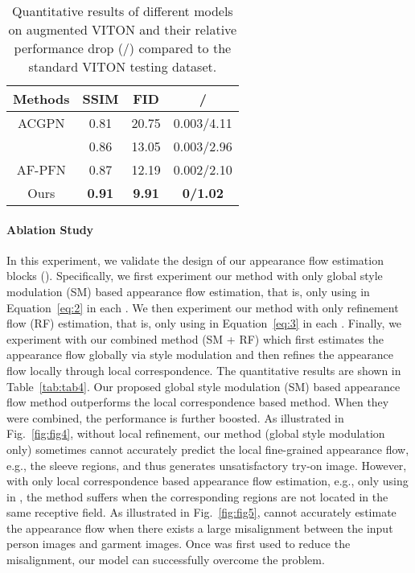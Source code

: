 \documentclass[10pt,twocolumn,letterpaper]{article}
\begin{document}
\begin{table}[t]
    \centering
    \begin{tabular}{c|c|c|c}
    \toprule
         Methods & SSIM & FID&/\\
         \midrule
         
         ACGPN &0.81&20.75&0.003/4.11\\
         \cite{han2019clothflow}&0.86& 13.05&0.003/2.96\\ 
         AF-PFN\cite{ge2021parser} &0.87 &12.19&0.002/2.10\\
         \midrule
         Ours&\textbf{0.91}& \textbf{9.91}&\textbf{0/1.02}\\
         \bottomrule
    \end{tabular}
    \caption{Quantitative results of different models on augmented VITON and their relative performance drop (/) compared to the standard VITON testing dataset.}
    \vspace{-0.4cm}
    \label{tab:tab3}
\end{table}

\paragraph{Ablation Study} In this experiment, we validate the design of our appearance flow estimation blocks (). Specifically, we first experiment our method with only global style modulation (SM) based appearance flow estimation, that is, only using  in Equation~\ref{eq:2} in each . We then experiment our method with only refinement flow (RF) estimation, that is, only using  in Equation~\ref{eq:3} in each . Finally, we experiment with our combined method (SM + RF) which first estimates the appearance flow globally via style modulation and then refines the appearance flow locally through local correspondence. The quantitative results are shown in Table~\ref{tab:tab4}. Our proposed global style modulation (SM) based appearance flow method outperforms the local correspondence based method. When they were combined, the performance is further boosted. As illustrated in Fig.~\ref{fig:fig4}, without local refinement, our method (global style modulation only) sometimes cannot accurately predict the local fine-grained appearance flow, e.g., the sleeve regions, and thus generates unsatisfactory try-on image. However, with only local correspondence based appearance flow estimation, e.g., only using  in , the method suffers when the corresponding regions are not located in the same receptive field. As illustrated in Fig.~\ref{fig:fig5},  cannot accurately estimate the appearance flow when there exists a large misalignment between the input person images and garment images. Once  was first used to reduce the misalignment, our model can successfully overcome the problem. 
\end{document}
